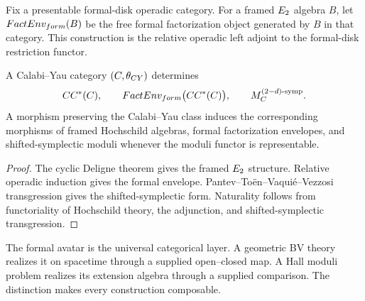 \begin{definition}
Fix a presentable formal-disk operadic category.  For a framed $E_2$ algebra $B$, let $FactEnv_{form}(B)$ be the free formal factorization object generated by $B$ in that category.  This construction is the relative operadic left adjoint to the formal-disk restriction functor.
\end{definition}

\begin{theorem}
A Calabi--Yau category $(C,\theta_{CY})$ determines
\[
 CC^*(C),
 \qquad
 FactEnv_{form}\bigl(CC^*(C)\bigr),
 \qquad
 M_{C}^{(2-d)\text{-symp}}.
\]
A morphism preserving the Calabi--Yau class induces the corresponding morphisms of framed Hochschild algebras, formal factorization envelopes, and shifted-symplectic moduli whenever the moduli functor is representable.
\end{theorem}
\begin{proof}
The cyclic Deligne theorem gives the framed $E_2$ structure.  Relative operadic induction gives the formal envelope.  Pantev--To\"en--Vaqui\'e--Vezzosi transgression gives the shifted-symplectic form.  Naturality follows from functoriality of Hochschild theory, the adjunction, and shifted-symplectic transgression.
\end{proof}

The formal avatar is the universal categorical layer.  A geometric BV theory realizes it on spacetime through a supplied open--closed map.  A Hall moduli problem realizes its extension algebra through a supplied comparison.  The distinction makes every construction composable.

